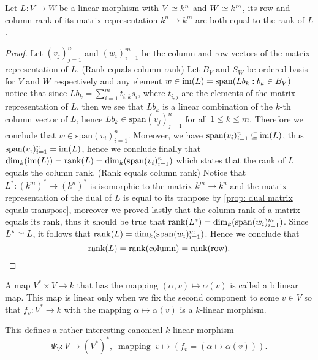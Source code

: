 \begin{proposition}
  \label{prop: column and row rank equal the rank}
  Let \(L: V \to W\) be a linear morphism with \(V \simeq k^n\) and \(W \simeq
  k^m\), its row and column rank of its matrix representation \(k^n \to k^m\)
  are both equal to the rank of \(L\). 
\end{proposition}

\begin{proof}
  Let \((v_j)_{j=1}^n\) and  \((w_i)_{i=1}^m\) be the column and row vectors of
  the matrix representation of \(L\).
  (Rank equals column rank) Let \(B_V\) and \(S_W\) be ordered basis for \(V\)
  and \(W\) respectively and any element \(w \in \operatorname{im}(L) = \mathrm{span}(Lb_k :
  b_k \in B_V)\) notice that since \(Lb_k = \sum_{i=1}^m t_{i, k} s_i\), where
  \(t_{i,j}\) are the elements of the matrix representation of \(L\), then we
  see that \(Lb_k\) is a linear combination of the \(k\)-th column vector of
  \(L\), hence \(Lb_k \in \mathrm{span}(v_j)_{j=1}^n\) for all \(1 \leq k \leq
  m\). Therefore we conclude that \(w \in \mathrm{span}(v_i)_{i=1}^n\).
  Moreover, we have \(\mathrm{span}(v_i)_{i=1}^n \subseteq \operatorname{im}(L)\), thus
  \(\mathrm{span}(v_i)_{i=1}^n = \operatorname{im}(L)\), hence we conclude finally that
  \(\dim_k(\operatorname{im}(L)) = \operatorname{rank}(L) = \dim_k(\mathrm{span}(v_i)_{i=1}^n)\) which
  states that the rank of \(L\) equals the column rank.
  (Rank equals column rank) Notice that \(L^\ast : (k^m)^\ast \to (k^n)^\ast\)
  is isomorphic to the matrix \(k^m \to k^n\) and the matrix representation of
  the dual of \(L\) is equal to its tranpose by \ref{prop: dual matrix equals
  transpose}, moreover we proved lastly that the column rank of a matrix equals
  its rank, thus it should be true that \(\operatorname{rank}(L^\ast) =
  \dim_k(\mathrm{span}(w_i)_{i=1}^m)\). Since \(L^\ast \simeq L\), it follows that
  \(\operatorname{rank}(L) = \dim_k(\mathrm{span}(w_i)_{i=1}^m)\). Hence we conclude that
  \[
    \operatorname{rank}(L) = \operatorname{rank}(\text{column}) = \operatorname{rank}(\text{row}).
  \] 
\end{proof}

\begin{definition}\label{def: bilinear map}
  A map \(V^\ast \times V \to k\) that has the mapping \((\alpha, v) \mapsto
  \alpha(v)\) is called a bilinear map. This map is linear only when we fix the
  second component to some \(v \in V\) so that \(f_v: V^\ast \to k\) with the
  mapping \(\alpha \mapsto \alpha(v)\) is a \(k\)-linear morphism.
\end{definition}

This defines a rather interesting canonical \(k\)-linear morphism 
\[
  \Psi_V : V \to (V^\ast)^\ast,\
  \text{ mapping }\ v \mapsto (f_v = (\alpha \mapsto \alpha(v))).
\] 

